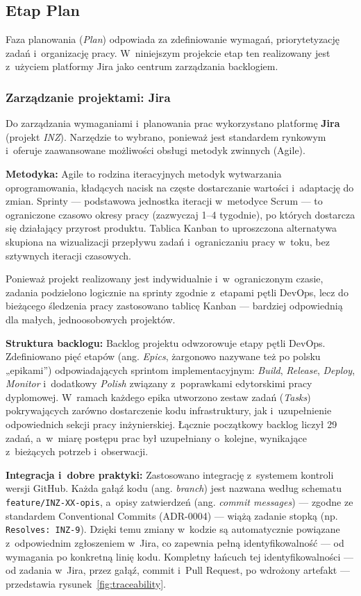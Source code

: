 \subsection{Etap Plan}
Faza planowania (\textit{Plan}) odpowiada za zdefiniowanie wymagań, priorytetyzację zadań i~organizację pracy. W~niniejszym projekcie etap ten realizowany jest z~użyciem platformy Jira jako centrum zarządzania backlogiem.

\subsubsection{Zarządzanie projektami: Jira}
Do zarządzania wymaganiami i~planowania prac wykorzystano platformę \textbf{Jira} (projekt \textit{INZ}).
Narzędzie to wybrano, ponieważ jest standardem rynkowym i~oferuje zaawansowane możliwości obsługi metodyk zwinnych (Agile).

\textbf{Metodyka:}
Agile to rodzina iteracyjnych metodyk wytwarzania oprogramowania, kładących nacisk na częste dostarczanie wartości i~adaptację do zmian. Sprinty --- podstawowa jednostka iteracji w~metodyce Scrum --- to ograniczone czasowo okresy pracy (zazwyczaj 1--4 tygodnie), po których dostarcza się działający przyrost produktu. Tablica Kanban to uproszczona alternatywa skupiona na wizualizacji przepływu zadań i~ograniczaniu pracy w~toku, bez sztywnych iteracji czasowych.

Ponieważ projekt realizowany jest indywidualnie i~w~ograniczonym czasie, zadania podzielono logicznie na sprinty zgodnie z~etapami pętli DevOps, lecz do bieżącego śledzenia pracy zastosowano tablicę Kanban --- bardziej odpowiednią dla małych, jednoosobowych projektów.

\textbf{Struktura backlogu:}
Backlog projektu odwzorowuje etapy pętli DevOps. Zdefiniowano pięć etapów (ang. \textit{Epics}, żargonowo nazywane też po polsku „epikami”) odpowiadających sprintom implementacyjnym: \textit{Build}, \textit{Release}, \textit{Deploy}, \textit{Monitor} i~dodatkowy \textit{Polish} związany z~poprawkami edytorskimi pracy dyplomowej.
W~ramach każdego epika utworzono zestaw zadań (\textit{Tasks}) pokrywających zarówno dostarczenie kodu infrastruktury, jak i~uzupełnienie odpowiednich sekcji pracy inżynierskiej.
Łącznie początkowy backlog liczył 29 zadań, a~w~miarę postępu prac był uzupełniany o~kolejne, wynikające z~bieżących potrzeb i~obserwacji.

\textbf{Integracja i~dobre praktyki:}
Zastosowano integrację z~systemem kontroli wersji GitHub. Każda gałąź kodu (ang. \textit{branch}) jest nazwana według schematu \texttt{feature/INZ-XX-opis}, a~opisy zatwierdzeń (ang. \textit{commit messages}) --- zgodne ze standardem Conventional Commits (ADR-0004) --- wiążą zadanie stopką (np. \texttt{Resolves: INZ-9}).
Dzięki temu zmiany w~kodzie są automatycznie powiązane z~odpowiednim zgłoszeniem w~Jira, co zapewnia pełną identyfikowalność --- od wymagania po konkretną linię kodu.
Kompletny łańcuch tej identyfikowalności --- od zadania w~Jira, przez gałąź, commit i~Pull Request, po wdrożony artefakt --- przedstawia rysunek~\ref{fig:traceability}.

